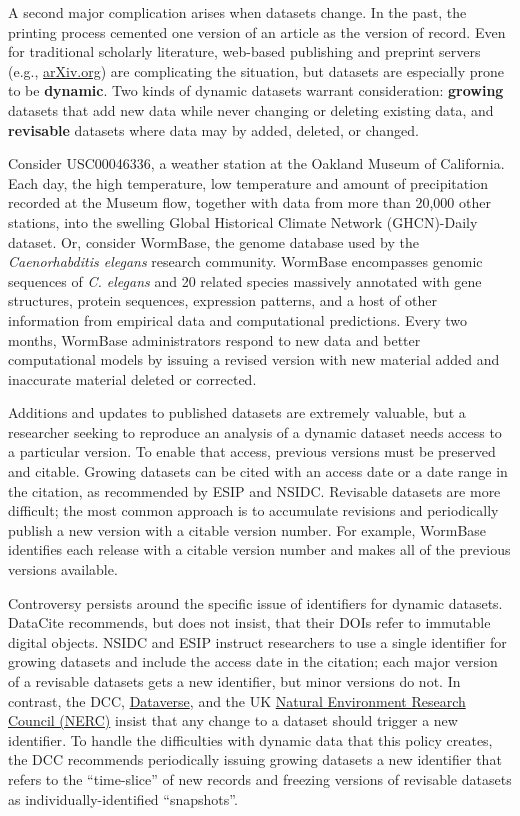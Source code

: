 \documentclass[10pt,a4paper,twocolumn]{article}
\begin{document}
{{A second major complication arises when datasets change.
In the past, the printing process cemented one version of an article as the version of record.
Even for traditional scholarly literature, web-based publishing and preprint servers (e.g., \href{http://arxiv.org/}{arXiv.org}) are complicating the situation, but datasets are especially prone to be \textbf{dynamic}.
Two kinds of dynamic datasets warrant consideration: \textbf{growing} datasets that add new data while never changing or deleting existing data, and \textbf{revisable} datasets where data may by added, deleted, or changed.

Consider USC00046336, a weather station at the Oakland Museum of California.
Each day, the high temperature, low temperature and amount of precipitation recorded at the Museum \cite{global_historical_climate_data_network_daily_????} flow, together with data from more than 20,000 other stations, into the swelling Global Historical Climate Network (GHCN)-Daily\cite{menne_overview_2012} dataset.
Or, consider WormBase, the genome database used by the \textit{Caenorhabditis elegans} research community.
WormBase encompasses genomic sequences of \emph{C. elegans} and 20 related species massively annotated with gene structures, protein sequences, expression patterns, and a host of other information from empirical data and computational predictions.
Every two months, WormBase administrators respond to new data and better computational models by issuing a revised version with new material added and inaccurate material deleted or corrected.

Additions and updates to published datasets are extremely valuable, but a researcher seeking to reproduce an analysis of a dynamic dataset needs access to a particular version.
To enable that access, previous versions must be preserved and citable.
Growing datasets can be cited with an access date or a date range in the citation, as recommended by ESIP and NSIDC.
Revisable datasets are more difficult; the most common approach is to accumulate revisions and periodically publish a new version with a citable version number.
For example, WormBase identifies each release with a citable version number and makes all of the previous versions available.

Controversy persists around the specific issue of identifiers for dynamic datasets. 
DataCite recommends, but does not insist, that their DOIs refer to immutable digital objects.
NSIDC and ESIP instruct researchers to use a single identifier for growing datasets and include the access date in the citation; each major version of a revisable datasets gets a new identifier, but minor versions do not.
In contrast, the DCC, \href{http://thedata.org/}{Dataverse}, and the UK \href{http://www.nerc.ac.uk/}{Natural Environment Research Council (NERC)} insist that any change to a dataset should trigger a new identifier\cite{ball_how_2012,altman_proposed_2007,callaghan_making_2012}.
To handle the difficulties with dynamic data that this policy creates, the DCC recommends periodically issuing growing datasets a new identifier that refers to the ``time-slice'' of new records and freezing versions of revisable datasets as individually-identified ``snapshots''.

}}
\end{document}
